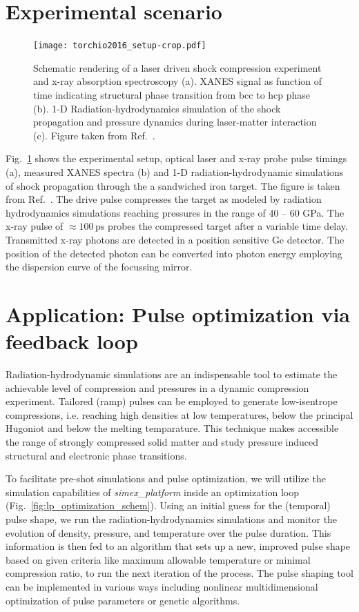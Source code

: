 \documentclass[10pt]{scrartcl}
\begin{document}
\section{Experimental scenario}
\begin{figure}[ht]
  \begin{center}
    \texttt{[image: torchio2016\_setup-crop.pdf]}
  \end{center}
  \caption{Schematic rendering of a laser driven shock compression experiment
  and x-ray absorption spectroscopy (a). XANES signal as function of time
indicating structural phase transition from bcc to hcp phase (b). 1-D
Radiation-hydrodynamics simulation of the shock
propagation and pressure dynamics during laser-matter interaction (c).
Figure taken from Ref.~\cite{Torchio2016}.}
  \label{fig:exp_setup}
\end{figure}
%
Fig.~\ref{fig:exp_setup} shows the experimental setup, optical laser and x-ray
probe pulse timings (a), measured XANES spectra (b) and 1-D radiation-hydrodynamic
simulations of shock propagation through the a sandwiched iron target.
The figure is taken from Ref.~\cite{Torchio2016}. The drive pulse compresses the
target as modeled by radiation hydrodynamics simulations reaching pressures in
the range of 40 -- 60 GPa. The x-ray pulse of $\approx 100\,\text{ps}$ probes
the compressed target after a variable time delay. Transmitted x-ray photons are
detected in a position sensitive Ge detector. The position of the detected
photon can be converted into photon energy employing the dispersion curve of the
focussing mirror.

\section{Application: Pulse optimization via feedback loop}
Radiation-hydrodynamic simulations are an indispensable tool to estimate the
achievable level of compression and pressures in a dynamic compression
experiment. Tailored (ramp) pulses can be employed to generate low-isentrope
compressions, i.e. reaching high densities at low temperatures, below the
principal Hugoniot and below the melting temparature. This technique makes
accessible the range of strongly compressed solid matter and study pressure
induced structural and electronic phase transitions.

To facilitate pre-shot simulations and pulse optimization, we will utilize the
simulation capabilities of \textit{simex\_platform} inside an optimization loop (Fig.~\ref{fig:lp_optimization_schem}).
Using an initial guess for the (temporal) pulse shape, we run the
radiation-hydrodynamics simulations and monitor the evolution of density,
pressure, and temperature over the pulse duration. This information is then fed
to an algorithm that sets up a new, improved pulse shape based on given criteria
like maximum allowable temperature or minimal compression ratio, to run the next
iteration of the process.
The pulse shaping tool can be implemented in various
ways including nonlinear multidimensional optimization of pulse parameters or genetic algorithms.
\end{document}
